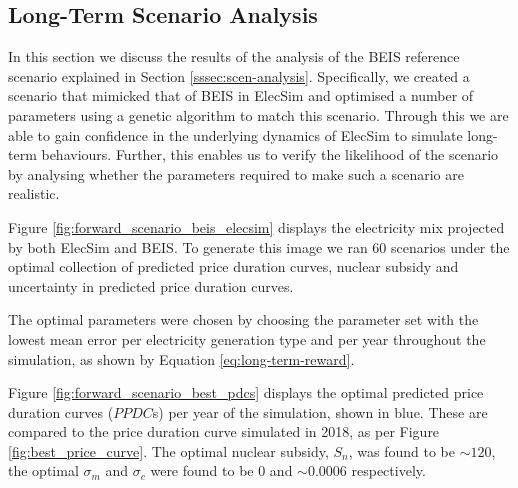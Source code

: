 





\subsection{Long-Term Scenario Analysis}

In this section we discuss the results of the analysis of the BEIS reference scenario explained in Section \ref{sssec:scen-analysis}. Specifically, we created a scenario that mimicked that of BEIS in ElecSim and optimised a number of parameters using a genetic algorithm to match this scenario. Through this we are able to gain confidence in the underlying dynamics of ElecSim to simulate long-term behaviours. Further, this enables us to verify the likelihood of the scenario by analysing whether the parameters required to make such a scenario are realistic.

Figure \ref{fig:forward_scenario_beis_elecsim} displays the electricity mix projected by both ElecSim and BEIS. To generate this image we ran 60 scenarios under the optimal collection of predicted price duration curves, nuclear subsidy and uncertainty in predicted price duration curves. 

The optimal parameters were chosen by choosing the parameter set with the lowest mean error per electricity generation type and per year throughout the simulation, as shown by Equation \ref{eq:long-term-reward}.


Figure \ref{fig:forward_scenario_best_pdcs} displays the optimal predicted price duration curves ($PPDC$s) per year of the simulation, shown in blue. These are compared to the price duration curve simulated in 2018, as per Figure \ref{fig:best_price_curve}. The optimal nuclear subsidy, $S_n$, was found to be ${\sim}$\textsterling $120$, the optimal $\sigma_m$ and $\sigma_c$ were found to be $0$ and ${\sim}0.0006$ respectively.


